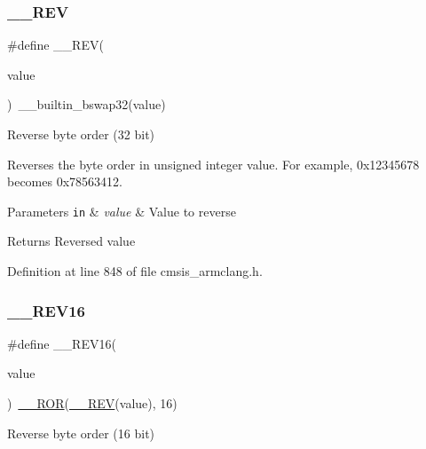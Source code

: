 \subsubsection{\texorpdfstring{\+\_\+\+\_\+\+R\+EV}{\_\_REV}\hspace{0.1cm}{\footnotesize\ttfamily [2/2]}}
{\footnotesize\ttfamily \#define \+\_\+\+\_\+\+R\+EV(\begin{DoxyParamCaption}\item[{}]{value }\end{DoxyParamCaption})~\+\_\+\+\_\+builtin\+\_\+bswap32(value)}



Reverse byte order (32 bit) 

Reverses the byte order in unsigned integer value. For example, 0x12345678 becomes 0x78563412. 
\begin{DoxyParams}[1]{Parameters}
\mbox{\tt in}  & {\em value} & Value to reverse \\
\hline
\end{DoxyParams}
\begin{DoxyReturn}{Returns}
Reversed value 
\end{DoxyReturn}


Definition at line 848 of file cmsis\+\_\+armclang.\+h.

\mbox{\label{group___c_m_s_i_s___core___instruction_interface_gad35497777af37e7809271b5e6f9510ba}} 
\subsubsection{\texorpdfstring{\+\_\+\+\_\+\+R\+E\+V16}{\_\_REV16}}
{\footnotesize\ttfamily \#define \+\_\+\+\_\+\+R\+E\+V16(\begin{DoxyParamCaption}\item[{}]{value }\end{DoxyParamCaption})~\hyperlink{cmsis__iccarm_8h_a7105032649bf6158d4d2d5dc38a3f94c}{\+\_\+\+\_\+\+R\+OR}(\hyperlink{group___c_m_s_i_s___core___instruction_interface_gadb92679719950635fba8b1b954072695}{\+\_\+\+\_\+\+R\+EV}(value), 16)}



Reverse byte order (16 bit) 

